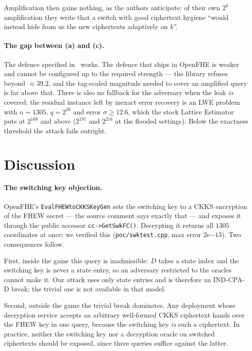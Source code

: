 \documentclass[11pt]{article}
\newcommand{\code}[1]{\texttt{#1}}
\begin{document}
Amplification then gains nothing, as the authors anticipate: of their own $2^k$
amplification they write that a switch with good ciphertext hygiene ``would instead hide from us
the new ciphertexts adaptively on $k$''.

\paragraph{The gap between (a) and (c).}
The defence specified in~\cite{santato2026} works. The defence that ships in
OpenFHE is weaker and cannot be configured up to the required strength ---
the library refuses beyond $\approx 39.2$, and the tag-scaled magnitude needed to cover an
amplified query is far above that. There is also no fallback for the adversary when the leak
\emph{is} covered: the residual instance left by inexact error recovery is an LWE problem with
$n = 1305$, $q = 2^{28}$ and error $\sigma \geq 12.6$, which the stock Lattice
Estimator~\cite{latticeestimator} puts at $2^{168}$ and above ($2^{191}$ and $2^{216}$ at the
flooded settings). Below the exactness threshold the attack fails outright.

\section{Discussion}
\label{sec:discussion}

\paragraph{The switching key objection.}
OpenFHE's \code{EvalFHEWtoCKKSKeyGen} sets the switching key to a CKKS encryption of the FHEW
secret --- the source comment says exactly that --- and exposes it through the public accessor
\code{cc->GetSwkFC()}. Decrypting it returns all $1305$ coordinates at once; we verified this
(\code{poc/swktest.cpp}, max error $2\mathrm{e}{-13}$). Two consequences follow.

First, inside the game this query is inadmissible: $D$ takes a state index and the switching key is
never a state entry, so an adversary restricted to the oracles cannot make it. Our attack uses only
state entries and is therefore an IND-CPA-D break; the trivial one is not available in that
model.

Second, outside the game the trivial break dominates. Any deployment whose decryption service
accepts an arbitrary well-formed CKKS ciphertext hands over the FHEW key in one query, because the
switching key \emph{is} such a ciphertext. In practice, neither the switching key nor a
decryption oracle on switched ciphertexts should be exposed, since three queries suffice against the latter.
\end{document}
